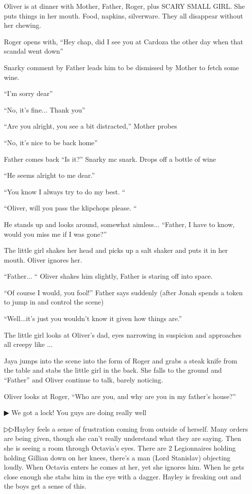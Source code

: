 Oliver is at dinner with Mother, Father, Roger, plus SCARY SMALL GIRL.  She puts things in her mouth.  Food, napkins, silverware. They all disappear without her chewing.



Roger opens with, ``Hey chap, did I see you at Cardoza the other day when that scandal went down''

Snarky comment by Father leads him to be dismissed by Mother to fetch some wine. 

``I'm sorry dear''

``No, it's fine... Thank you''

``Are you alright, you see a bit distracted,'' Mother probes

``No, it's nice to be back home''

Father comes back ``Is it?'' Snarky mc snark.  Drops off a bottle of wine

``He seems alright to me dear.''

``You know I always try to do my best. ``

``Oliver, will you pass the klipchops please.  ``

He stands up and looks around, somewhat aimless... ``Father, I have to know, would you miss me if I was gone?''

The little girl shakes her head and picks up a salt shaker and puts it in her mouth. Oliver ignores her.

``Father... `` Oliver shakes him slightly, Father is staring off into space.  

``Of course I would, you fool!'' Father says suddenly (after Jonah spends a token to jump in and control the scene) 

``Well...it's just you wouldn't know it given how things are.''

The little girl looks at Oliver's dad, eyes narrowing in suspicion and approaches all creepy like ... 

Jaya jumps into the scene into the form of Roger and grabs a steak knife from the table and stabs the little girl in the back.  She falls to the ground and ``Father'' and Oliver continue to talk, barely noticing.

Oliver looks at Roger, ``Who are you, and why are you in my father's house?''



 {\color[RGB]{68,68,68}▶ } We got a lock!  You guys are doing really well



▷▷Hayley feels a sense of frustration coming from outside of herself.  Many orders are being given, though she can't really understand what they are saying.   Then she is seeing a room through Octavia's eyes.  There are 2 Legionnaires holding holding Gillian down on her knees, there's a man (Lord Stanislav) objecting loudly.  When Octavia enters he comes at her, yet she ignores him.  When he gets close enough she stabs him in the eye with a dagger.   Hayley is freaking out and the boys get a sense of this.  

